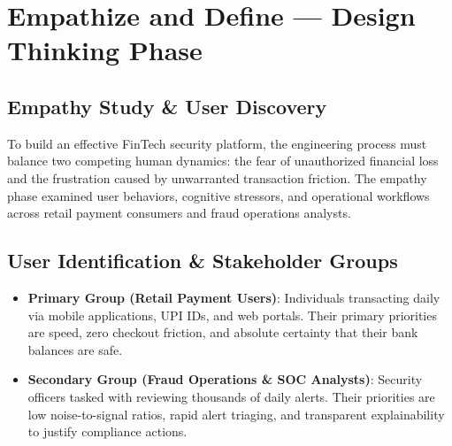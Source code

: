 \chapter{Empathize and Define — Design Thinking Phase}
\label{chap:empathize_define}

\section{Empathy Study \& User Discovery}
To build an effective FinTech security platform, the engineering process must balance two competing human dynamics: the fear of unauthorized financial loss and the frustration caused by unwarranted transaction friction. The empathy phase examined user behaviors, cognitive stressors, and operational workflows across retail payment consumers and fraud operations analysts.

\section{User Identification \& Stakeholder Groups}
\begin{itemize}
    \item \textbf{Primary Group (Retail Payment Users)}: Individuals transacting daily via mobile applications, UPI IDs, and web portals. Their primary priorities are speed, zero checkout friction, and absolute certainty that their bank balances are safe.
    \item \textbf{Secondary Group (Fraud Operations \& SOC Analysts)}: Security officers tasked with reviewing thousands of daily alerts. Their priorities are low noise-to-signal ratios, rapid alert triaging, and transparent explainability to justify compliance actions.
\end{itemize}

